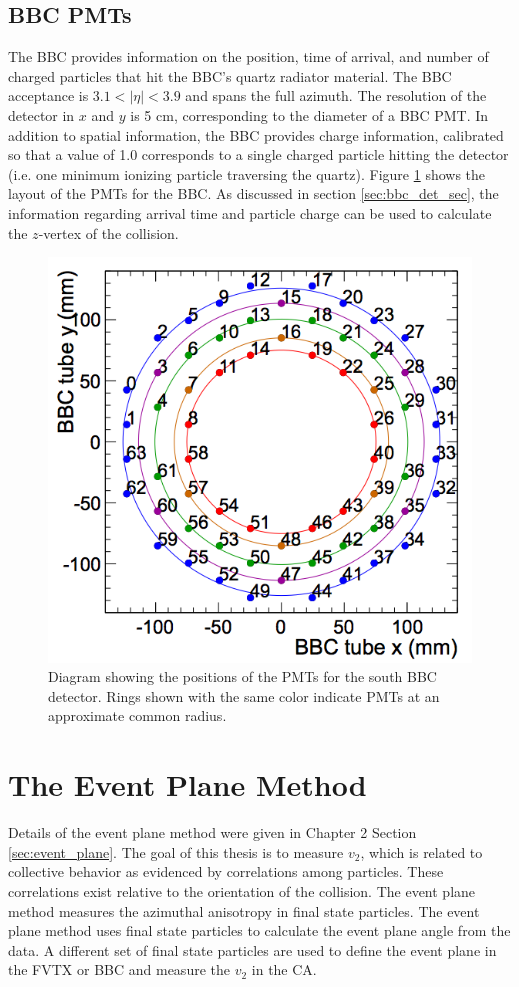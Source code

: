 \subsection{BBC PMTs}
The BBC provides information on the position, time of arrival, and number of charged particles that hit the BBC's quartz radiator material. The BBC acceptance is $3.1 < |\eta| < 3.9$ and spans the full azimuth. The resolution of the detector in $x$ and $y$ is 5 cm, corresponding to the diameter of a BBC PMT. In addition to spatial information, the BBC provides charge information, calibrated so that a value of 1.0 corresponds to a single charged particle hitting the detector (i.e. one minimum ionizing particle traversing the quartz). Figure \ref{fig:bbc_rings} shows the layout of the PMTs for the BBC. As discussed in section \ref{sec:bbc_det_sec}, the information regarding arrival time and particle charge can be used to calculate the $z$-vertex of the collision. 
\begin{figure}[!ht]
\centering
\includegraphics[width=0.55\linewidth]{figs/bbc_rings.png}
\caption{Diagram showing the positions of the PMTs for the south BBC detector. Rings shown with the same color indicate PMTs at an approximate common radius.}
\label{fig:bbc_rings}
\end{figure}


\section{The Event Plane Method}
Details of the event plane method were given in Chapter 2 Section \ref{sec:event_plane}.
The goal of this thesis is to measure $v_2$, which is related to collective behavior as evidenced by correlations among particles. These correlations exist relative to the orientation of the collision. The event plane method measures the azimuthal anisotropy in final state particles. The event plane method uses final state particles to calculate the event plane angle from the data. A different set of final state particles are used to define the event plane in the FVTX or BBC and measure the $v_2$ in the CA. 

